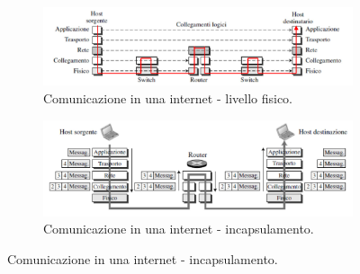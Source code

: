 \documentclass[11pt, italian, openany]{book}
\begin{document}
\begin{sloppypar}
\begin{figure}[h!]
	\begin{subfigure}{0.49 \linewidth} \centering
		\includegraphics[scale=0.18]{images/livello-fisico-tcp_ip.png}
		\caption{Comunicazione in una internet - livello fisico.}
	\end{subfigure}
	\begin{subfigure}{0.49 \linewidth} \centering
		\includegraphics[scale=0.18]{images/incapsulamento-tcp_ip.png}
		\caption{Comunicazione in una internet - incapsulamento.}
	\end{subfigure}
\end{figure}


\end{sloppypar}
\end{document}

